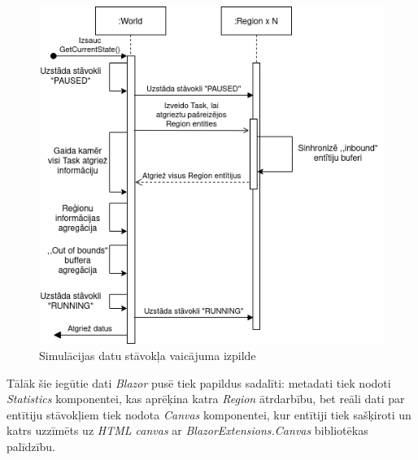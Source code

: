 \begin{figure}[H]
	\centering
	\includegraphics[scale=0.7]{images/DiseaseCore-GetData.png}
	\caption{Simulācijas datu stāvokļa vaicājuma izpilde}
	\label{img:squance-diagram-get-status}
\end{figure}

Tālāk šie iegūtie dati \emph{Blazor} pusē tiek papildus sadalīti: metadati tiek nodoti
\emph{Statistics} komponentei, kas aprēķina katra \emph{Region} ātrdarbību, bet
reāli dati par entītiju stāvokļiem tiek nodota \emph{Canvas} komponentei, kur
entītiji tiek sašķiroti un katrs uzzīmēts uz \emph{HTML canvas} ar \emph{BlazorExtensions.Canvas} bibliotēkas palīdzību.
